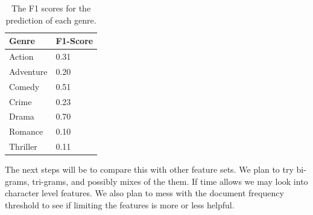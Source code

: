 \documentclass[11pt]{article}
\begin{document}
\begin{table}[h]
	\label{tab:f1scores}
\begin{center}
	\begin{tabular}{| l | l |}
		\hline
		Genre & F1-Score \\
	  	\hline			
	  	Action & 0.31 \\
	  	Adventure & 0.20 \\
	  	Comedy & 0.51 \\
	  	Crime & 0.23 \\
	  	Drama & 0.70 \\
	  	Romance & 0.10 \\
	  	Thriller & 0.11 \\
	  \hline  
	\end{tabular}
\end{center}
	\caption{The F1 scores for the prediction of each genre.}
\end{table}

The next steps will be to compare this with other feature sets. We plan to try bi-grams, tri-grams, and possibly mixes of the them. If time allows we may look into character level features. We also plan to mess with the document frequency threshold to see if limiting the features is more or less helpful.
\end{document}
